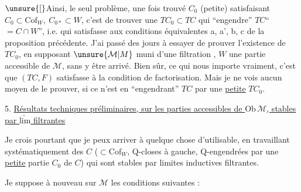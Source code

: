
$\unsure{[}$Ainsi, le seul problème, une fois trouvé $C_0$
(petite) satisfaisant $C_0\subset\mathrm{Cof}_W,\ C_{0*}\subset W$,
c'est de trouver une  $TC_0\subset TC$
qui ``engendre'' $TC$``$=C\cap W$'', i.e. qui satisfasse
aux conditions équivalentes a, a', b, c de la
proposition précédente. J'ai passé des jours
à essayer de prouver l'existence de $TC_0$,
en supposant $\unsure{\mathcal M|M}$ muni d'une filtration
,  $W$ une partie accessible de $\mathcal M$,
sans y être arrivé. Bien sûr,  ce qui
nous importe vraiment, c'est que $(TC,F)$ satisfasse
à la condition de factorisation. Mais je
ne vois aucun moyen de le prouver, si ce
n'est en ``engendrant''  $TC$  par une \uline{petite}
 $TC_0$.

5. \uline{Résultats techniques préliminaires, sur les parties
accessibles de $\mathrm{Ob}\,\mathcal M$, stables par $\underrightarrow{\mathrm{lim}}$ filtrantes}

Je crois pourtant que je peux arriver à
quelque chose d'utilisable, en travaillant systématiquement  des $C$ ($\subset\mathrm{Cof}_W$, Q-closes à
gauche, Q-engendrées  par une \uline{petite} partie
$C_0$ \deleted{\unsure{)}} de $C$) qui sont stables par  limites
inductives filtrantes.

Je suppose à nouveau  sur $\mathcal M$ les
conditions suivantes :


